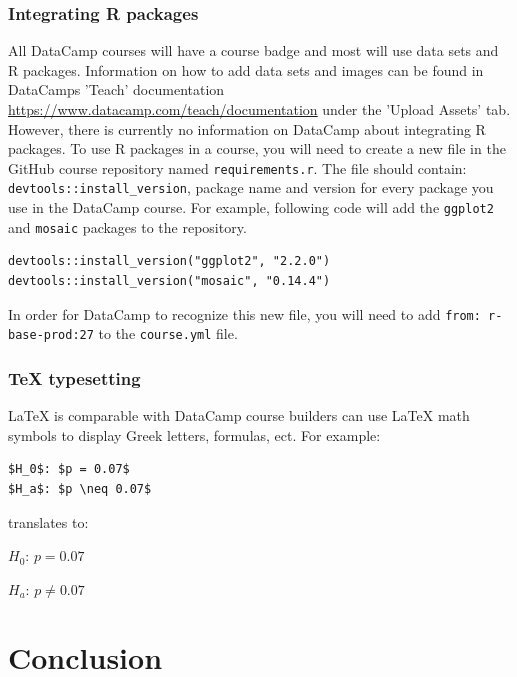 \documentclass[12pt]{article}\usepackage[]{graphicx}\usepackage[]{color}
\begin{document}
\subsubsection{Integrating R packages}
All DataCamp courses will have a course badge and most will use data sets and R packages. Information on how to add data sets and images
can be found in DataCamps 'Teach' documentation \url{https://www.datacamp.com/teach/documentation} under the 'Upload Assets' tab. However,
there is currently no information on DataCamp about integrating R packages. To use R packages in a course, you will need to create a new file
in the GitHub course repository named \texttt{requirements.r}. The file should contain: \texttt{devtools::install\_version}, package name and version for 
every package you use in the DataCamp course. For example, following code will add the \texttt{ggplot2} and \texttt{mosaic} packages to the repository.

\begin{verbatim}
devtools::install_version("ggplot2", "2.2.0")
devtools::install_version("mosaic", "0.14.4")
\end{verbatim}
In order for DataCamp to recognize this new file, you will need to add \texttt{from: r-base-prod:27} to the \texttt{course.yml} file.

\subsubsection{TeX typesetting}
LaTeX is comparable with DataCamp course builders can use LaTeX math symbols to display Greek letters, formulas, ect. For example:
\begin{verbatim}
$H_0$: $p = 0.07$
$H_a$: $p \neq 0.07$
\end{verbatim}

translates to:

$H_0$: $p = 0.07$

$H_a$: $p \neq 0.07$

\section{Conclusion}



\end{document}
